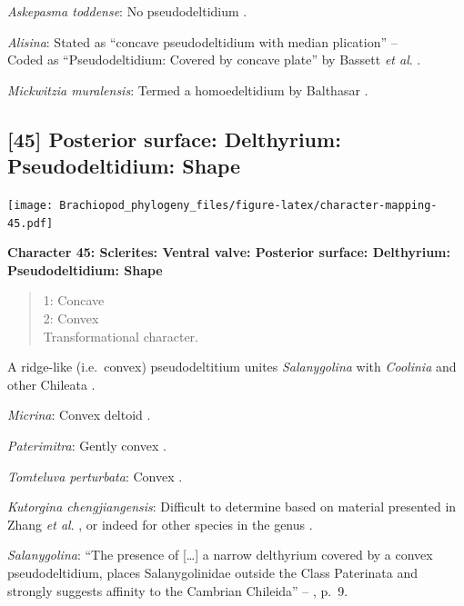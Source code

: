 \documentclass[openany]{book}
\theoremstyle{definition}
\theoremstyle{definition}
\theoremstyle{definition}
\theoremstyle{remark}
\begin{document}
\emph{Askepasma toddense}: No pseudodeltidium
\citep[p.~153]{Williams2000BrachiopodaLinguliformea}.

\emph{Alisina}: Stated as ``concave pseudodeltidium with median
plication'' -- \citet{Williams2000BrachiopodaLinguliformea}\\
Coded as ``Pseudodeltidium: Covered by concave plate'' by Bassett
\emph{et al}. \citeyearpar{Bassett2001Functionalmorphology}.

\emph{Mickwitzia muralensis}: Termed a homoedeltidium by Balthasar
\citeyearpar{Balthasar2004Shellstructure}.

\hypertarget{posterior-surface-delthyrium-pseudodeltidium-shape}{%
\subsection*{{[}45{]} Posterior surface: Delthyrium: Pseudodeltidium:
Shape}\label{posterior-surface-delthyrium-pseudodeltidium-shape}}

\texttt{[image: Brachiopod\_phylogeny\_files/figure-latex/character-mapping-45.pdf]}

\textbf{Character 45: Sclerites: Ventral valve: Posterior surface:
Delthyrium: Pseudodeltidium: Shape}

\begin{quote}
1: Concave\\
2: Convex\\
Transformational character.
\end{quote}

A ridge-like (i.e.~convex) pseudodeltitium unites \emph{Salanygolina}
with \emph{Coolinia} and other Chileata
\citep[p.~6]{Holmer2009Theenigmatic}.

\emph{Micrina}: Convex deltoid \citep{Holmer2008TheEarly}.

\emph{Paterimitra}: Gently convex \citep[see][fig.
83.1]{Williams2000BrachiopodaLinguliformea}.

\emph{Tomteluva perturbata}: Convex \citep{Streng2016Anew}.

\emph{Kutorgina chengjiangensis}: Difficult to determine based on
material presented in Zhang \emph{et al}.
\citeyearpar{Zhang2007Rhynchonelliformeanbrachiopods}, or indeed for
other species in the genus
\citep[e.g.][]{Williams2000BrachiopodaLinguliformea, Skovsted2005EarlyCambrian, Holmer2018Theattachment}.

\emph{Salanygolina}: ``The presence of {[}\ldots{}{]} a narrow
delthyrium covered by a convex pseudodeltidium, places Salanygolinidae
outside the Class Paterinata and strongly suggests affinity to the
Cambrian Chileida'' -- \citet{Holmer2009Theenigmatic}, p.~9.
\end{document}
